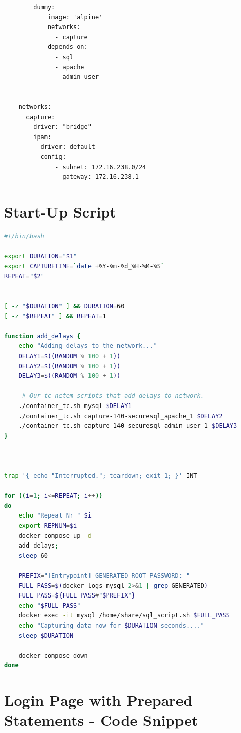 \documentclass[msc,deptreport, cs]{infthesis} %
\begin{document}
\begin{verbatim}
        dummy:
            image: 'alpine'
            networks:
              - capture
            depends_on:
              - sql
              - apache
              - admin_user


    networks:
      capture:
        driver: "bridge"
        ipam:
          driver: default
          config:
              - subnet: 172.16.238.0/24
                gateway: 172.16.238.1
  \end{verbatim}

\section{Start-Up Script}


\begin{lstlisting}[language=bash]
#!/bin/bash

export DURATION="$1"
export CAPTURETIME=`date +%Y-%m-%d_%H-%M-%S`
REPEAT="$2"


[ -z "$DURATION" ] && DURATION=60
[ -z "$REPEAT" ] && REPEAT=1

function add_delays {
    echo "Adding delays to the network..."
    DELAY1=$((RANDOM % 100 + 1))
    DELAY2=$((RANDOM % 100 + 1))
    DELAY3=$((RANDOM % 100 + 1))

     # Our tc-netem scripts that add delays to network.
    ./container_tc.sh mysql $DELAY1
    ./container_tc.sh capture-140-securesql_apache_1 $DELAY2
    ./container_tc.sh capture-140-securesql_admin_user_1 $DELAY3
}



trap '{ echo "Interrupted."; teardown; exit 1; }' INT

for ((i=1; i<=REPEAT; i++))
do
    echo "Repeat Nr " $i
    export REPNUM=$i
    docker-compose up -d
    add_delays;
    sleep 60
    
    PREFIX="[Entrypoint] GENERATED ROOT PASSWORD: "
    FULL_PASS=$(docker logs mysql 2>&1 | grep GENERATED)
    FULL_PASS=${FULL_PASS#"$PREFIX"}
    echo "$FULL_PASS"
    docker exec -it mysql /home/share/sql_script.sh $FULL_PASS
    echo "Capturing data now for $DURATION seconds...."
    sleep $DURATION

    docker-compose down
done

\end{lstlisting}

\section{Login Page with Prepared Statements - Code Snippet}
\end{document}
